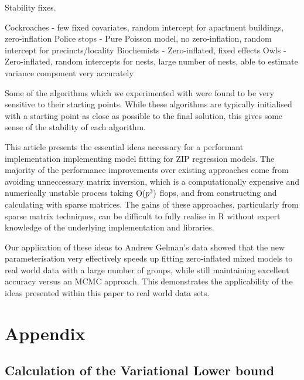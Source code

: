 			Stability fixes.

			Cockroaches - few fixed covariates, random intercept for apartment buildings, zero-inflation
			Police stops - Pure Poisson model, no zero-inflation, random intercept for precincts/locality
			Biochemists - Zero-inflated, fixed effects
			Owls - Zero-inflated, random intercepts for nests, large number of nests, able to estimate variance 
			component very accurately
				
			Some of the algorithms which we experimented with were found to be very sensitive to their starting points.
			While these algorithms are typically initialised with a starting point as close as possible to the final
			solution, this gives some sense of the stability of each algorithm.
					
			This article presents the essential ideas necessary for a performant implementation implementing model fitting
			for ZIP regression models.%
			The majority of the performance
			improvements over existing approaches come from avoiding unneccessary matrix inversion, which is a
			computationally expensive and numerically unstable process taking $\text{O}(p^3)$ flops, and from constructing and 
			calculating	with sparse matrices. The gains of these approaches, particularly from sparse matrix techniques, 
			can be difficult to fully realise in R without expert knowledge of the underlying implementation and libraries.
					
			Our application of these ideas to Andrew Gelman's data showed that the new parameterisation very effectively
			speeds up fitting zero-inflated mixed models to real world data with a large number of groups, while still
			maintaining excellent accuracy versus an MCMC approach. This demonstrates the applicability of the ideas
			presented within this paper to real world data sets.
					
			\newpage
			\section{Appendix} 
			\subsection{Calculation of the Variational Lower bound}
					
